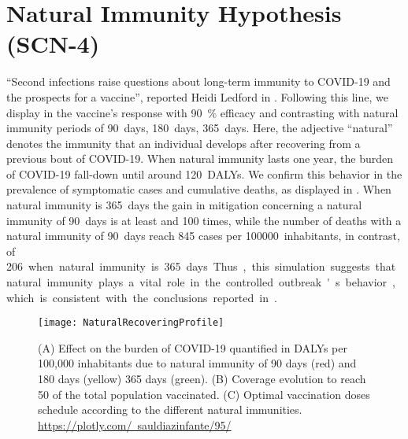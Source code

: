 \section*{Natural Immunity Hypothesis (SCN-4)}
%
    ``Second infections raise questions about long-term immunity to COVID-19 and the prospects for a vaccine'',  reported
    Heidi Ledford in \cite{Ledford2020b}. Following this line, we
    display in  the vaccine's response with
    \SI{90}{\percent} efficacy and
    contrasting with  natural immunity periods of
    \SI{90}{days}, \SI{180}{days}, \SI{365}{days}. Here,
    the adjective ``natural'' denotes the immunity that an individual
    develops after recovering from a previous
    bout of COVID-19. When natural
    immunity lasts one year, the burden of
    COVID-19 fall-down until around
    \SI{120}{DALYs}. We confirm this behavior in
    the prevalence of symptomatic
    cases and cumulative deaths, as displayed in
    . When
    natural immunity is
    \SI{365}{days} the gain in mitigation
    concerning a natural immunity of
    \SI{90}{days} is at least and \num{100}
    times, while the number of deaths
    with a natural immunity of \SI{90}{days}
    reach \num{845} cases per
    \SI{100000}{inhabitants}, in contrast, of
    \SI{206} when natural immunity is
    \SI{365}{days}. Thus, this simulation
    suggests that natural immunity
    plays a vital role in the controlled
    outbreak's behavior, which is
    consistent with the conclusions reported in
    \cite{Jeyanathan2020}.
%
    \begin{figure*}[tbh!]
        \centering
        \texttt{[image: NaturalRecoveringProfile]}
        \caption[Effect of natural immunity on the burden of COVID-19]{
            (A) Effect on the burden of COVID-19 quantified in DALYs per
            100,000 inhabitants due to natural immunity of 90 days (red) and
            180 days (yellow) 365 days (green).
            (B) Coverage evolution to reach \SI{50}{\per} of the total
            population vaccinated.
            (C) Optimal vaccination doses schedule according to the different
            natural immunities.
            \href{https://plotly.com/~sauldiazinfante/95/}{%
                https://plotly.com/~sauldiazinfante/95/}
        }
        \label{fig:natural_recovering_profile}
    \end{figure*}
%

